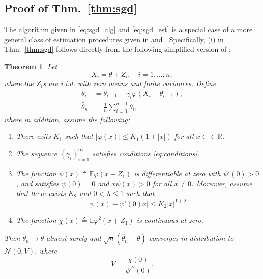 \documentclass[letterpaper, conference]{IEEEtran}      %
\newtheorem{thm}{\bf{Theorem}}
\begin{document}
\subsection*{Proof of Thm.~\ref{thm:sgd}}
The algorithm given in \eqref{eq:sgd_alg} and \eqref{eq:sgd_est} is a special case of a more general class of estimation procedures given in \cite{polyak1992acceleration} and \cite{polyak1990new}. Specifically, (i) in Thm.~\ref{thm:sgd} follows directly from the following simplified version of \cite[Thm. 4]{polyak1992acceleration}:
\begin{thm}{\cite[Thm. 4]{polyak1992acceleration}} \label{thm:polyak_juditsky}
Let 
\[
X_i = \theta + Z_i,\quad i=1,\ldots,n,
\]
where the $Z_i$s are i.i.d. with zero means and finite variances. Define
\begin{align*}
\theta_i & = \theta_{i-1} + \gamma_i \varphi(X_i - \theta_{i-1}), \\
\widehat{\theta}_n & = \frac{1}{n} \sum_{i=0}^{n-1} \theta_i, 
\end{align*}
where in addition, assume the following: 
\begin{enumerate}
\item[(i)] There exits $K_1$ such that $\left| \varphi(x) \right| \leq K_1(1+|x|)$ for all $x\in \in \mathbb R$.
\item[(ii)] The sequence $\left\{ \gamma_i \right\}_{i=1}^\infty$ satisfies conditions \eqref{eq:conditions}.
\item[(iii)] The function $\psi(x) \triangleq \mathbb E \varphi(x+Z_1)$ is differentiable at zero with $\psi'(0)>0$, and satisfies $\psi(0)=0$ and $x\psi(x) >0$ for all $x\neq 0$.
Moreover, assume that there exists $K_2$ and $0<\lambda \leq 1$ such that
\begin{equation}
\label{eq:Polyak_Juditsky_cond3}
\left| \psi(x) - \psi'(0)x \right|\leq K_2 |x|^{1+\lambda}.
\end{equation}
\item[(iv)] The function 
$\chi(x) \triangleq \mathbb E \varphi^2(x+Z_1)$ is continuous at zero. 
\end{enumerate}
Then $\widehat{\theta}_n \rightarrow \theta$ almost surely and $ \sqrt{n}(\widehat{\theta}_n - \theta)$ converges in distribution to $\mathcal N(0,V)$, where
\[
V = \frac{ \chi(0)} {\psi'^2(0)}. 
\]
\end{thm}
\end{document}
